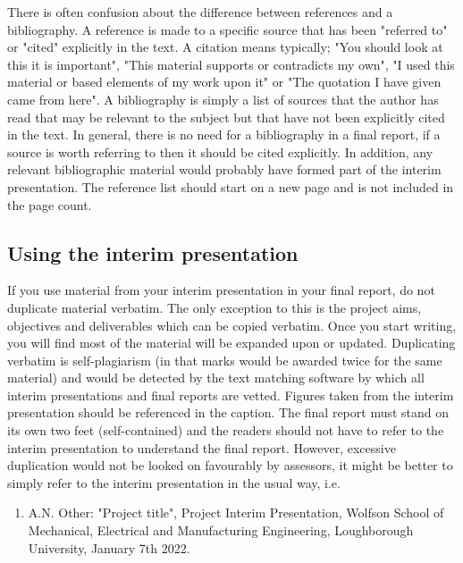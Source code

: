 \documentclass[12pt]{article}
\begin{document}
There is often confusion about the difference between references and a
bibliography. A reference is made to a specific source that has been
"referred to" or "cited" explicitly in the text. A citation means
typically; "You should look at this it is important", "This material
supports or contradicts my own", "I used this material or based elements
of my work upon it" or "The quotation I have given came from here". A
bibliography is simply a list of sources that the author has read that
may be relevant to the subject but that have not been explicitly cited
in the text. In general, there is no need for a bibliography in a final
report, if a source is worth referring to then it should be cited
explicitly. In addition, any relevant bibliographic material would
probably have formed part of the interim presentation. The reference
list should start on a new page and is not included in the page count.

\hypertarget{using-the-interim-presentation}{%
\subsection{Using the interim
presentation}\label{using-the-interim-presentation}}

If you use material from your interim presentation in your final report,
do not duplicate material verbatim. The only exception to this is the
project aims, objectives and deliverables which can be copied verbatim.
Once you start writing, you will find most of the material will be
expanded upon or updated. Duplicating verbatim is self-plagiarism (in
that marks would be awarded twice for the same material) and would be
detected by the text matching software by which all interim
presentations and final reports are vetted. Figures taken from the
interim presentation should be referenced in the caption. The final
report must stand on its own two feet (self-contained) and the readers
should not have to refer to the interim presentation to understand the
final report. However, excessive duplication would not be looked on
favourably by assessors, it might be better to simply refer to the
interim presentation in the usual way, i.e.

\begin{enumerate}
\def\labelenumi{\arabic{enumi}.}
\item
  A.N. Other: "Project title", Project Interim Presentation, Wolfson
  School of Mechanical, Electrical and Manufacturing Engineering,
  Loughborough University, January 7th 2022.
\end{enumerate}
\end{document}
